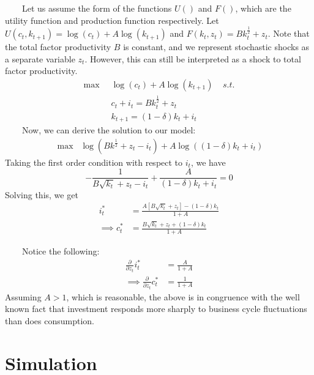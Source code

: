 \documentclass[
]{article}
\begin{document}
~~~~Let us assume the form of the functions \(U()\) and \(F()\), which
are the utility function and production function respectively. Let
\(U(c_t, k_{t+1}) = \log (c_t) + A \log (k_{t+1})\) and
\(F(k_t, z_t) = Bk_t^{\frac{1}{2}} + z_t\). Note that the total factor
productivity \(B\) is constant, and we represent stochastic shocks as a
separate variable \(z_t\). However, this can still be interpreted as a
shock to total factor productivity.\\
\[\begin{aligned}
\max \;\;&\log (c_t) + A \log (k_{t+1}) \; \;\;\; s.t. \\
&c_t + i_t = Bk_t^{\frac{1}{2}} + z_t  \\
&k_{t+1} = (1 - \delta) k_t + i_t
\end{aligned}\] ~~~~Now, we can derive the solution to our model:
\[\begin{aligned}
\max \;\;\log \left(Bk^\frac{1}{2} + z_t - i_t\right) + A\log\left((1 - \delta) k_t + i_t\right)
\end{aligned}\] Taking the first order condition with respect to
\(i_t\), we have
\[-\frac{1}{B\sqrt{k_t} + z_t - i_t} + \frac{A}{(1 - \delta) k_t + i_t} = 0\]
Solving this, we get \[\begin{aligned}
i_t^* &= \frac{A[B\sqrt{k_t} + z_t] - (1-\delta)k_t}{1 + A} \\
\implies c_t^* &= \frac{B\sqrt{k_t} + z_t + (1- \delta)k_t}{1 + A}
\end{aligned}\]

~~~~Notice the following: \[\begin{aligned}
\frac{\partial}{\partial z_t}i_t^* &= \frac{A}{1 + A} \\
\implies \frac{\partial}{\partial z_t}c_t^* &= \frac{1}{1 + A}
\end{aligned}\] Assuming \(A>1\), which is reasonable, the above is in
congruence with the well known fact that investment responds more
sharply to business cycle fluctuations than does consumption.

\hypertarget{simulation}{%
\section{Simulation}\label{simulation}}
\end{document}
